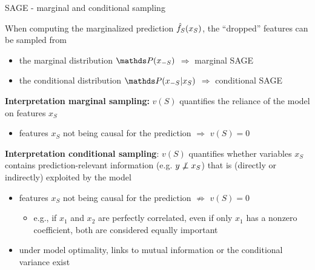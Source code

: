 \documentclass[11pt,compress,t,notes=noshow, aspectratio=169, xcolor=table]{beamer}
\begin{document}
\begin{frame}{SAGE - marginal and conditional sampling}

When computing the marginalized prediction $\fh_S(x_S)$, the ``dropped'' features can be sampled from \\
\begin{itemize}
\item the marginal distribution $\P(x_{-S})$ $\Rightarrow$ marginal SAGE
\item the conditional distribution $\P(x_{-S}|x_S)$ $\Rightarrow$ conditional SAGE
\end{itemize}



\lz\pause

\textbf{Interpretation marginal sampling:} $v(S)$ quantifies the reliance of the model on features $x_S$
\begin{itemize}
  \item %
  features $x_S$ not being causal for the prediction $\Rightarrow$ $v(S) = 0$
\end{itemize}

\lz\pause

\textbf{Interpretation conditional sampling}: $v(S)$ quantifies whether variables $x_S$ contains prediction-relevant information (e.g. $y \not \indep x_S$) that is (directly or indirectly) exploited by the model
\begin{itemize}
  \item %
  features $x_S$ not being causal for the prediction $\not \Rightarrow$ $v(S) = 0$
  \begin{itemize}
      \item e.g., if $x_1$ and $x_2$ are perfectly correlated, even if only $x_1$ has a nonzero coefficient, both are considered equally important
  \end{itemize}
  \item under model optimality, links to mutual information or the conditional variance exist
\end{itemize}

\end{frame}
\end{document}
